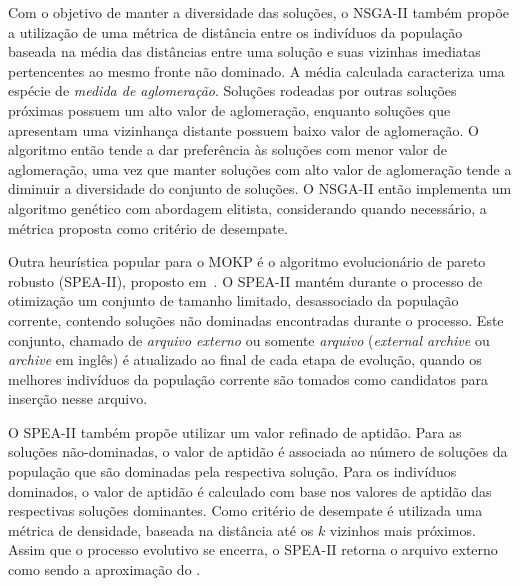 Com o objetivo de manter a diversidade das soluções,
o NSGA-II também propõe a utilização de uma métrica de distância entre os indivíduos da população
baseada na média das distâncias entre uma solução e suas
vizinhas imediatas pertencentes ao mesmo fronte não dominado.
A média calculada caracteriza uma espécie de \emph{medida de aglomeração}.
Soluções rodeadas por outras soluções próximas possuem um alto valor de aglomeração,
enquanto soluções que apresentam uma vizinhança distante possuem baixo valor de aglomeração.
O algoritmo então tende a dar preferência às soluções com menor valor de aglomeração,
uma vez que manter soluções com alto valor de aglomeração tende a diminuir a diversidade do conjunto de soluções.
O NSGA-II então implementa um algoritmo genético com abordagem elitista,
considerando quando necessário, a métrica proposta como critério de desempate.

Outra heurística popular para o MOKP é o algoritmo evolucionário de pareto robusto
(SPEA-II), proposto em~\cite{zitzler2001spea2}.
O SPEA-II mantém durante o processo de otimização um conjunto de tamanho limitado,
desassociado da população corrente, contendo soluções não dominadas encontradas durante o processo.
Este conjunto, chamado de \emph{arquivo externo}
ou somente \emph{arquivo} (\emph{external archive} ou \emph{archive} em inglês)
é atualizado ao final de cada etapa de evolução, quando os melhores
indivíduos da população corrente são tomados como candidatos para inserção nesse arquivo.

O SPEA-II também propõe utilizar um valor refinado de aptidão.
Para as soluções não-dominadas, o valor de aptidão é associada
ao número de soluções da população que são dominadas pela respectiva solução.
Para os indivíduos dominados, o valor de aptidão é calculado com base nos valores de aptidão
das respectivas soluções dominantes.
Como critério de desempate é utilizada uma métrica de densidade, baseada na distância
até os $k$ vizinhos mais próximos.
Assim que o processo evolutivo se encerra, o SPEA-II retorna o arquivo externo como sendo a aproximação do \paretoset.

